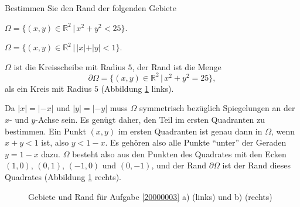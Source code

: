 Bestimmen Sie den Rand der folgenden Gebiete
\begin{teilaufgaben}
\item
$\Omega=\{(x,y)\in\mathbb R^2\,|\, x^2+y^2<25\}$.
\item
$\Omega=\{(x,y)\in\mathbb R^2\,|\, |x|+|y|<1\}$.
\end{teilaufgaben}

\begin{loesung}
\begin{teilaufgaben}
\item
$\Omega$ ist die Kreisscheibe mit Radius $5$, der Rand ist die Menge
\[
\partial\Omega=\{(x,y)\in\mathbb R^2\,|\, x^2+y^2=25\},
\]
als ein Kreis mit Radius $5$ (Abbildung \ref{20000003:fig} links).
\item
Da $|x|=|-x|$ und $|y|=|-y|$ muss $\Omega$ symmetrisch bezüglich
Spiegelungen an der $x$- und $y$-Achse sein. Es genügt daher,
den Teil im ersten Quadranten zu bestimmen.  Ein Punkt $(x,y)$
im ersten Quadranten ist genau dann in $\Omega$, wenn $x+y<1$ ist,
also $y<1-x$. Es gehören also alle Punkte ``unter'' der Geraden
$y=1-x$ dazu. $\Omega$ besteht also aus den Punkten des
Quadrates mit den Ecken $(1,0)$, $(0,1)$, $(-1,0)$ und $(0,-1)$,
und der Rand $\partial\Omega$ ist der Rand dieses Quadrates
(Abbildung \ref{20000003:fig} rechts).
\qedhere
\end{teilaufgaben}
\begin{figure}
\begin{center}
\qquad
{}
\end{center}
\caption{Gebiete und Rand für Aufgabe \ref{20000003} a) (links)
und b) (rechts)\label{20000003:fig}}
\end{figure}
\end{loesung}

